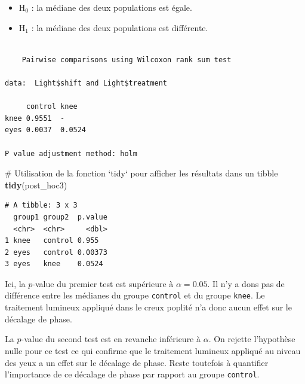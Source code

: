 \documentclass[a4paperpaper,]{article}
\newenvironment{Shaded}{\begin{snugshade}}{\end{snugshade}}
\newcommand{\CommentTok}[1]{\textcolor[rgb]{0.54,0.53,0.53}{#1}}
\newcommand{\KeywordTok}[1]{\textcolor[rgb]{0.12,0.11,0.11}{\textbf{#1}}}
\newcommand{\NormalTok}[1]{\textcolor[rgb]{0.12,0.11,0.11}{#1}}
\newcommand{\OperatorTok}[1]{\textcolor[rgb]{0.12,0.11,0.11}{#1}}
\newcommand{\StringTok}[1]{\textcolor[rgb]{0.75,0.01,0.01}{#1}}
\providecommand{\tightlist}{%
  \setlength{\itemsep}{0pt}\setlength{\parskip}{0pt}}
\begin{document}
\begin{itemize}
\tightlist
\item
  H\(_0\) : la médiane des deux populations est égale.
\item
  H\(_1\) : la médiane des deux populations est différente.
\end{itemize}

\begin{Shaded}
\end{Shaded}

\begin{verbatim}

    Pairwise comparisons using Wilcoxon rank sum test 

data:  Light$shift and Light$treatment 

     control knee  
knee 0.9551  -     
eyes 0.0037  0.0524

P value adjustment method: holm 
\end{verbatim}

\begin{Shaded}
\begin{Highlighting}[]
\CommentTok{# Utilisation de la fonction `tidy` pour afficher les résultats dans un tibble}
\KeywordTok{tidy}\NormalTok{(post_hoc3)}
\end{Highlighting}
\end{Shaded}

\begin{verbatim}
# A tibble: 3 x 3
  group1 group2  p.value
  <chr>  <chr>     <dbl>
1 knee   control 0.955  
2 eyes   control 0.00373
3 eyes   knee    0.0524 
\end{verbatim}

Ici, la \(p\)-value du premier test est supérieure à \(\alpha = 0.05\). Il n'y a dons pas de différence entre les médianes du groupe \texttt{control} et du groupe \texttt{knee}. Le traitement lumineux appliqué dans le creux poplité n'a donc aucun effet sur le décalage de phase.

La \(p\)-value du second test est en revanche inférieure à \(\alpha\). On rejette l'hypothèse nulle pour ce test ce qui confirme que le traitement lumineux appliqué au niveau des yeux a un effet sur le décalage de phase. Reste toutefois à quantifier l'importance de ce décalage de phase par rapport au groupe \texttt{control}.
\end{document}
